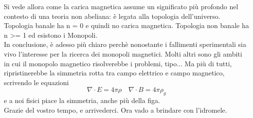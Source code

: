\documentclass{report}
\begin{document}
Si vede allora come la carica magnetica assume un significato più profondo nel contesto
di una teoria non abeliana: è legata alla topologia dell'universo. Topologia banale
ha n = 0 e quindi no carica magnetica. Topologia non banale ha n >= 1 ed esistono i Monopoli.\\

In conclusione, è adesso più chiaro perchè nonostante i fallimenti sperimentali
sia vivo l'interesse per la ricerca dei monopoli magnetici.
Molti altri sono gli ambiti in cui il monopolo magnetico risolverebbe i problemi, tipo...
Ma più di tutti, ripristinerebbe la simmetria rotta tra campo elettrico e campo magnetico,
scrivendo le equazioni
$$ \nabla \cdot E = 4\pi \rho \quad \nabla \cdot B = 4\pi\rho_g $$
e a noi fisici piace la simmetria, anche più della figa.\\

Grazie del vostro tempo, e arrivederci. Ora vado a brindare con l'idromele.
\end{document}
